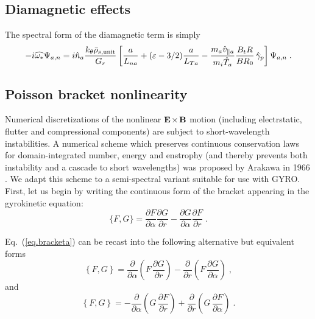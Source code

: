 \subsection{Diamagnetic effects}

The spectral form of the diamagnetic term is simply
%
\begin{equation}
-i \widehat{\omega_*} \Psi_{a,n}= i {\hat n}_a \frac{k_\theta \bar{\rho}_{s,{\rm unit}}}{G_r} 
 \left[ \frac{a}{L_{na}} + ({\varepsilon}-3/2) \frac{a}{L_{Ta}} 
 - \frac{m_a \hat{v}_{\parallel a}}{m_i \hat{T}_a} \frac{B_t R}{B R_0} \, 
 \hat{\gamma}_p \right] \Psi_{a,n} \; .
\end{equation} 

\subsection{Poisson bracket nonlinearity}
\label{sec.nonlinear}

Numerical discretizations of the nonlinear ${\bf E}\hskip -1pt \times \hskip -1pt {\bf B}$ motion
(including electrstatic, flutter and compressional components) 
are subject to short-wavelength instabilities.  A numerical scheme 
which preserves continuous conservation laws for domain-integrated 
number, energy and enstrophy (and thereby prevents both instability 
and a cascade to short wavelengths) was proposed by Arakawa 
in 1966 \cite{arakawa:1966}.  We adapt this scheme to a semi-spectral 
variant suitable for use with GYRO.  First, let us begin by writing 
the continuous form of the bracket appearing in the gyrokinetic equation:
%
\begin{equation}
\{ F , G \} = 
\frac{\partial F}{\partial\alpha}
\frac{\partial G}{\partial r} 
-
\frac{\partial G}{\partial\alpha}
\frac{\partial F}{\partial r} \; .
\label{eq.bracketa}
\end{equation}

\noindent
Eq.~(\ref{eq.bracketa}) can be recast into the following alternative 
but equivalent forms
%
\begin{equation}
\left\{ F , G \right\} = 
\frac{\partial }{\partial\alpha} 
\left(F \, \frac{\partial G}{\partial r} \right) 
-
\frac{\partial}{\partial r} 
\left(F \, \frac{\partial G}{\partial\alpha} \right) \; ,
\label{eq.bracketb}
\end{equation}
\noindent 
and
%
\begin{equation}
\left\{ F , G \right\} = 
- \frac{\partial }{\partial\alpha} 
\left(G \, \frac{\partial F}{\partial r} \right) 
+
\frac{\partial}{\partial r} 
\left(G \, \frac{\partial F}{\partial\alpha} \right) \; .
\label{eq.bracketc}
\end{equation}

